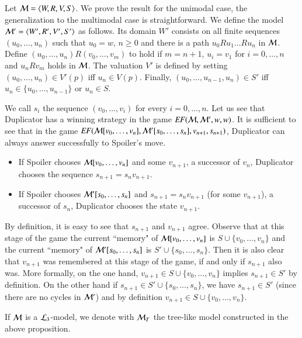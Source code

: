 \begin{pf}
Let $\mathcal{M}=\langle W,R,V,S \rangle$.  We prove the result for the unimodal
case, the generalization to the multimodal case is straightforward.
We define the model $\mathcal{M}'=\langle W',R',V',S' \rangle$ as follows. Its
domain $W'$ consists on all finite sequences $(u_0,\dots,u_n)$ such
that $u_0=w$, $n\geq 0$ and there is a path $u_0Ru_1\dots Ru_n$ in
$\mathcal{M}$. Define $(u_0,\dots,u_n)R(v_0,\dots,v_m)$ to hold if
$m=n+1$, $u_i=v_1$ for $i=0,\dots,n$ and $u_nRv_m$ holds in
$\mathcal{M}$. The valuation $V'$ is defined by setting
$(u_0,\dots,u_n)\in V'(p)$ iff $u_n\in V(p)$. Finally,
$(u_0,\dots,u_{n-1},u_n)\in S'$ iff $u_n\in\{u_0,\dots,u_{n-1}\}$ or
$u_n\in S$.

We call $s_i$ the sequence $(v_0,\dots,v_i)$ for every
$i=0,\dots,n$. Let us see that Duplicator has a winning strategy in
the game $\mathit{EF}(\mathcal{M},\mathcal{M}',w,w)$. It is sufficient to see that in
the game
$\mathit{EF}(\mathcal{M}[v_0,\dots,v_n],\mathcal{M}'[s_0,\dots,s_n],v_{n+1},s_{n+1})$,
Duplicator can always answer successfully to Spoiler's move.
\begin{itemize}
\item
If Spoiler chooses $\mathcal{M}[v_0,\dots,v_n]$ and some $v_{n+1}$, a
successor of $v_n$, Duplicator chooses the sequence
$s_{n+1}=s_nv_{n+1}$.

\item
If Spoiler chooses $\mathcal{M}'[s_0,\dots,s_n]$ and $s_{n+1}=s_nv_{n+1}$
(for some $v_{n+1}$), a successor of $s_n$, Duplicator chooses the
state $v_{n+1}$.
\end{itemize}
By definition, it is easy to see that $s_{n+1}$ and $v_{n+1}$ agree.
Observe that at this stage of the game the current ``memory" of
$\mathcal{M}[v_0,\dots,v_n]$ is $S \cup \{v_0,\dots,v_n\}$ and the
current ``memory" of $\mathcal{M}'[s_0,\dots,s_n]$ is $S' \cup
\{s_0,\dots,s_n\}$. Then it is also clear that $v_{n+1}$ was
remembered at this stage of the game, if and only if $s_{n+1}$ also
was. More formally, on the one hand, $v_{n+1}\in S \cup
\{v_0,\dots,v_n\}$ implies $s_{n+1} \in S'$ by definition. On the
other hand if $s_{n+1}\in S' \cup \{s_0,\dots,s_n\}$, we have
$s_{n+1}\in S'$ (since there are no cycles in $\mathcal{M}'$) and by
definition $v_{n+1}\in S \cup \{v_0,\dots,v_n\}$.
\end{pf}

If $\mathcal{M}$ is a $\mathcal{L}_3$-model, we denote with $\mathcal{M}_T$ the
tree-like model constructed in the above proposition.

